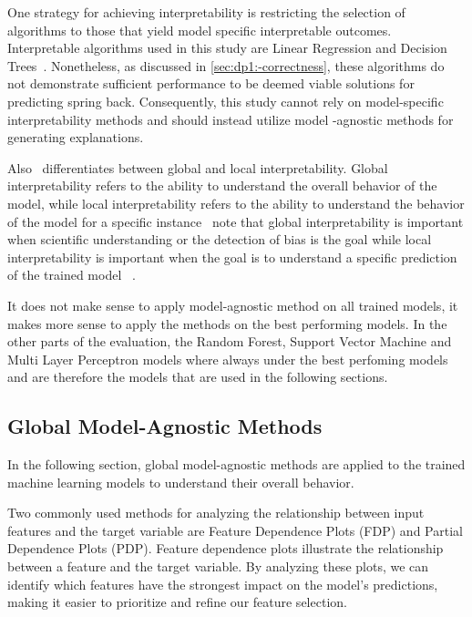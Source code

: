 
One strategy for achieving interpretability is restricting the selection of algorithms to those that yield
model specific interpretable outcomes.
Interpretable algorithms used in this study are Linear Regression and Decision
Trees~\cite[p. 35]{molnar2020interpretable}.
Nonetheless, as discussed in \cref{sec:dp1:-correctness}, these algorithms do not demonstrate sufficient
performance to be deemed viable solutions for predicting spring back.
Consequently, this study cannot rely on model-specific interpretability methods and should instead utilize model
-agnostic methods for generating explanations.

Also~\cite{doshi2017towards} differentiates between global and local interpretability.
Global interpretability refers to the ability to understand the overall behavior of
the model, while local interpretability refers to the ability to understand the behavior of the
model for a specific instance~\cite[p. 7]{doshi2017towards}
\cite{doshi2017towards} note that global interpretability is important when scientific understanding or the detection
of bias is the goal while local interpretability is important when the goal is to understand a specific prediction of
the trained model
~\cite[p. 7]{doshi2017towards}.

It does not make sense to apply model-agnostic method on all trained models, it makes more sense to
apply the methods on the best performing models.
In the other parts of the evaluation, the Random Forest, Support Vector Machine and Multi Layer Perceptron models
where always under the best perfoming models and are therefore the models that are used in the following
sections.

\subsection{Global Model-Agnostic Methods}\label{subsec:global-model-agnostic-methods}
In the following section, global model-agnostic methods are applied to the trained machine learning models to
understand their overall behavior.

Two commonly used methods for analyzing the relationship between input features
and the target variable are Feature Dependence Plots (FDP) and Partial Dependence Plots (PDP).
Feature dependence plots illustrate the relationship between a feature and the target variable.
By analyzing these plots, we can identify which features have the strongest impact on the model's
predictions, making it easier to prioritize and refine our feature selection.

